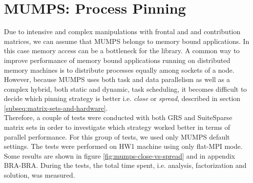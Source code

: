 \section{MUMPS: Process Pinning}
\label{subseq:mm-mumps-process-pinning}

Due to intensive and complex manipulations with frontal and and contribution matrices, we can assume that MUMPS belongs to memory bound applications. In this case memory access can be a bottleneck for the library. A common way to improve performance of memory bound applications running on distributed memory machines is to distribute processes equally among sockets of a node.\\


However, because MUMPS uses both task and data parallelism as well as a complex hybrid, both static and dynamic, task scheduling, it becomes difficult to decide which pinning strategy is better i.e. \textit{close} or \textit{spread}, described in section \ref{subseq:matrix-sets-and-hardware}.\\


Therefore, a couple of tests were conducted with both GRS and SuiteSparse matrix sets in order to investigate which strategy worked better in terms of parallel performance. For this group of tests, we used only MUMPS default settings. The tests were performed on HW1 machine using only flat-MPI mode. Some results are shown in figure \ref{fig:mumps-close-vs-spread} and in appendix BRA-BRA. During the tests, the total time spent, i.e. analysis, factorization and solution, was measured.\\



